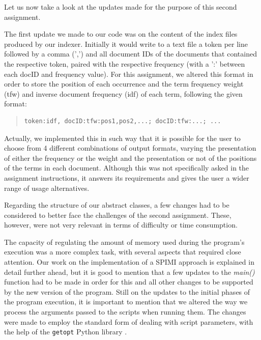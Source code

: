 \documentclass[12pt]{article}
\begin{document}
Let us now take a look at the updates made for the purpose of this second 
assignment.

The first update we made to our code was on the content of the index files 
produced by our indexer. Initially it would write to a text file a token
per line followed by a comma (',') and all document IDs of the documents that
contained the respective token, paired with the respective frequency (with
a ':' between each docID and frequency value).
For this assignment, we altered this format in order to store the position
of each occurrence and the term frequency weight (tfw) and inverse document 
frequency (idf) of each term, following the given format:

\begingroup
\addtolength\leftmargini{-0.4in}
\begin{quote}
\begin{verbatim}
token:idf, docID:tfw:pos1,pos2,...; docID:tfw:...; ...
\end{verbatim}
\end{quote}
\endgroup

Actually, we implemented this in such way that it is possible for the user
to choose from 4 different combinations of output formats, varying the 
presentation of either the frequency or the weight and the presentation or
not of the positions of the terms in each document.
Although this was not specifically asked in the assignment instructions,
it answers its requirements and gives the user a wider range of usage 
alternatives.

Regarding the structure of our abstract classes, a few changes had to be
considered to better face the challenges of the second assignment.
These, however, were not very relevant in terms of difficulty or time
consumption.

The capacity of regulating the amount of memory used during the program's
execution was a more complex task, with several aspects that required close
attention. Our work on the implementation of a SPIMI approach is explained
in detail further ahead, but it is good to mention that a few updates to 
the {\it main()\/} function had to be made in order for this and all other 
changes to be supported by the new version of the program.
Still on the updates to the initial phases of the program execution, it is
important to mention that we altered the way we process the arguments passed
to the scripts when running them. The changes were made to employ the standard
form of dealing with script parameters, with the help of the \texttt{getopt}
Python library \cite{getopt}.
\end{document}
